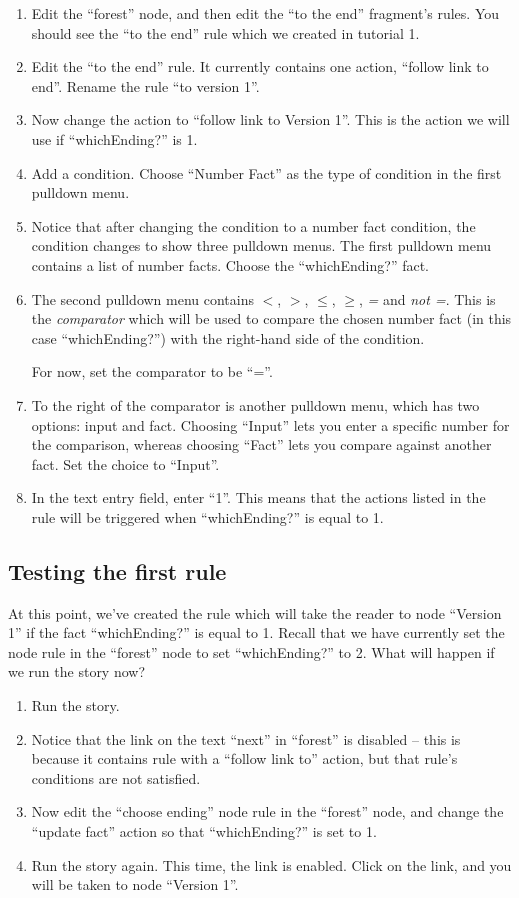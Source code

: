 \documentclass{article}
\begin{document}
\begin{enumerate}
    \item Edit the ``forest'' node, and then edit the ``to the end''  fragment's rules. You should see the ``to the end'' rule which we created in tutorial 1.
    \item Edit the ``to the end'' rule. It currently contains one action, ``follow link to end''. Rename the rule ``to version 1''.
    \item Now change the action to ``follow link to Version 1''. This is the action we will use if ``whichEnding?'' is 1.
    \item Add a condition. Choose ``Number Fact'' as the type of condition in the first pulldown menu.
    \item Notice that after changing the condition to a number fact 
    condition, the condition changes to show three pulldown menus. The first pulldown menu contains a list of number facts. Choose the ``whichEnding?'' fact.
    \item The second pulldown menu contains \textit{$<$}, \textit{$>$}, \textit{$\le$}, \textit{$\ge$}, \textit{=} and \textit{not =}. This is the \textit{comparator} which will be used to compare the chosen number fact (in this case ``whichEnding?'') with the right-hand side of the condition.
    
For now, set the comparator to be ``=''.
    \item To the right of the comparator is another pulldown menu, which has two options: input and fact. Choosing ``Input'' lets you enter a specific number for the comparison, whereas choosing ``Fact'' lets you compare against another fact. Set the choice to ``Input''.
    \item In the text entry field, enter ``1''. This means that the actions listed in the rule will be triggered when ``whichEnding?'' is equal to 1.
\end{enumerate}

\subsection{Testing the first rule}

At this point, we've created the rule which will take the reader to node ``Version 1'' if the fact ``whichEnding?'' is equal to 1. Recall that we have currently set the node rule in the ``forest'' node to set ``whichEnding?'' to 2. What will happen if we run the story now?

\begin{enumerate}
    \item Run the story.
    \item Notice that the link on the text ``next'' in ``forest'' is disabled -- this is because it contains rule with a ``follow link to'' action, but that rule's conditions are not satisfied.
    \item Now edit the ``choose ending'' node rule in the ``forest'' node, and change the ``update fact'' action so that ``whichEnding?'' is set to 1.
    \item Run the story again. This time, the link is enabled. Click on the link, and you will be taken to node ``Version 1''.
\end{enumerate}
\end{document}
